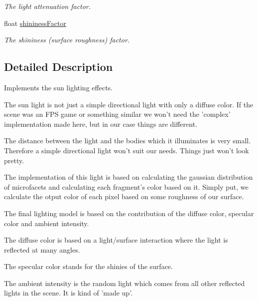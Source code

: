 \begin{DoxyCompactItemize}
\begin{DoxyCompactList}\small\item\em The light attenuation factor. \end{DoxyCompactList}\item 
\hypertarget{class_sun_light_a17462d147dd00e17383fa563477a1089}{float \hyperlink{class_sun_light_a17462d147dd00e17383fa563477a1089}{shininess\-Factor}}\label{class_sun_light_a17462d147dd00e17383fa563477a1089}

\begin{DoxyCompactList}\small\item\em The shininess (surface roughness) factor. \end{DoxyCompactList}\end{DoxyCompactItemize}


\subsection{Detailed Description}
Implements the sun lighting effects. 

The sun light is not just a simple directional light with only a diffuse color. If the scene was an F\-P\-S game or something similar we won't need the 'complex' implementation made here, but in our case things are different.

The distance between the light and the bodies which it illuminates is very small. Therefore a simple directional light won't suit our needs. Things just won't look pretty.

The implementation of this light is based on calculating the gaussian distribution of microfacets and calculating each fragment's color based on it. Simply put, we calculate the otput color of each pixel based on some roughness of our surface.

The final lighting model is based on the contribution of the {\ttfamily diffuse color}, {\ttfamily specular color} and {\ttfamily ambient intensity}.
\begin{DoxyItemize}
\item The {\ttfamily diffuse color} is based on a light/surface interaction where the light is reflected at many angles.
\item The {\ttfamily specular color} stands for the shinies of the surface.
\item The {\ttfamily ambient intensity} is the random light which comes from all other reflected lights in the scene. It is kind of 'made up'.
\end{DoxyItemize}

